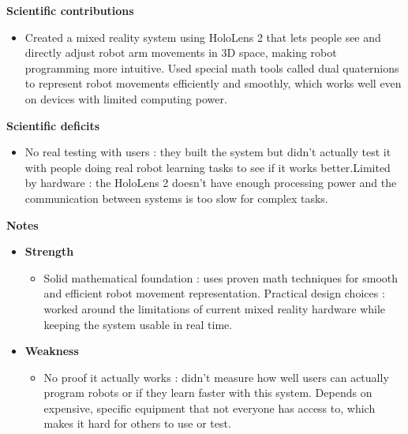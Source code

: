 \documentclass[report.tex]{subfiles}
\begin{document}
\noindent\textbf{Scientific contributions} 
\begin{itemize}
        \item Created a mixed reality system using HoloLens 2 that lets people see and directly adjust robot arm movements in 3D space, making robot programming more intuitive. Used special math tools called dual quaternions to represent robot movements efficiently and smoothly, which works well even on devices with limited computing power. 
        
\end{itemize}

\noindent\textbf{Scientific deficits} 
\begin{itemize}
        \item  No real testing with users : they built the system but didn't actually test it with people doing real robot learning tasks to see if it works better.Limited by hardware : the HoloLens 2 doesn't have enough processing power and the communication between systems is too slow for complex tasks. 
        
       
\end{itemize}

\noindent\textbf{Notes}
\begin{itemize}
    \item \noindent\textbf {Strength}
    \begin{itemize}
        \item Solid mathematical foundation : uses proven math techniques for smooth and efficient robot movement representation. 
        Practical design choices : worked around the limitations of current mixed reality hardware while keeping the system usable in real time. 
        
       
    \end{itemize}
    
    \item \noindent\textbf{Weakness}
    \begin{itemize}
        \item No proof it actually works : didn't measure how well users can actually program robots or if they learn faster with this system. Depends on expensive, specific equipment that not everyone has access to, which makes it hard for others to use or test. 
    \end{itemize}
\end{itemize}
\end{document}
